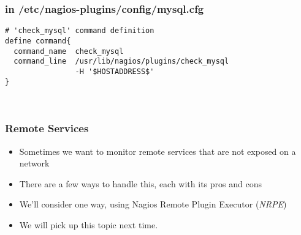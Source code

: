 \documentclass[10pt]{beamer}
\begin{document}
\begin{frame}[fragile]
  \frametitle{in /etc/nagios-plugins/config/mysql.cfg}

\begin{Verbatim}[commandchars=\\\[\]]
# 'check_mysql' command definition
define command{
  command_name  check_mysql
  command_line  /usr/lib/nagios/plugins/check_mysql
                -H '$HOSTADDRESS$' 
}



\end{Verbatim}
\end{frame}


\begin{frame}
  \frametitle{Remote Services}


\begin{itemize}
  \item Sometimes we want to monitor remote services that are not exposed on a network
  \item There are a few ways to handle this, each with its pros and cons
  \item We'll consider one way, using Nagios Remote Plugin Executor (\emph{NRPE})
  \item We will pick up this topic next time.
\end{itemize}

\end{frame}
\end{document}
